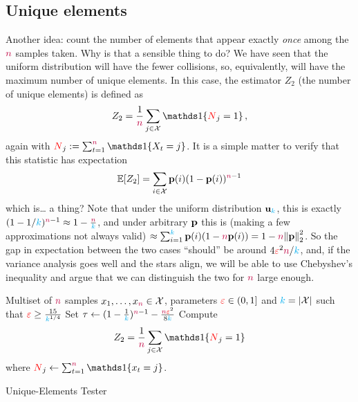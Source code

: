 \subsection{Unique elements}
  \label{sec:uniformity:unique} Another idea: count the number of elements that appear exactly \emph{once} among the ${\textcolor{purple}{n}}$ samples taken. Why is that a sensible thing to do? We have seen that the uniform distribution will have the fewer collisions, so, equivalently, will have the maximum number of unique elements. In this case, the estimator $Z_2$ (the number of unique elements) is defined as
\begin{equation}
  \label{eq:def:z2}
    Z_2 = \frac{1}{\ns} \sum_{j\in\domain} \indic{\occur_j=1}\,,
\end{equation}
again with $\occur_j \eqdef \sum_{t=1}^\ns \indic{X_t=j}$. It is a simple matter to verify that this statistic has expectation
\begin{equation}
  \label{eq:z2:expectation}
  \expect{Z_2} = \sum_{i\in\domain} \p(i)(1-\p(i))^{\ns-1}
\end{equation}
which is\dots{} a thing? Note that under the uniform distribution $\mathbf{u}_{\textcolor{cyan}{k}}$, this is exactly $(1-1/{\textcolor{cyan}{k}})^{{\textcolor{purple}{n}}-1}\approx 1 - \frac{{\textcolor{purple}{n}}}{{\textcolor{cyan}{k}}}$, and under arbitrary $\mathbf{p}$ this is (making a few approximations not always valid) $\approx \sum_{i=1}^\ab \p(i)(1-\ns\p(i)) = 1 - \ns\normtwo{\p}^2$. So the gap in expectation between the two cases ``should'' be around $4\textcolor{red}{\varepsilon}^2{\textcolor{purple}{n}}/{\textcolor{cyan}{k}}$, and, if the variance analysis goes well and the stars align, we will be able to use Chebyshev's inequality and argue that we can distinguish the two for ${\textcolor{purple}{n}}$ large enough.

\begin{algorithm}[ht!]
  \begin{algorithmic}[1]
    \Require Multiset of ${\textcolor{purple}{n}}$ samples $x_1,\dots,x_{\textcolor{purple}{n}} \in \mathcal{X}$, parameters $\textcolor{red}{\varepsilon}\in(0,1]$ and $\ab = \abs{\domain}$ such that $\textcolor{red}{\varepsilon} \geq \frac{15}{{\textcolor{cyan}{k}}^{1/4}}$
    \State Set $\tau \gets (1-\frac{1}{{\textcolor{cyan}{k}}})^{{\textcolor{purple}{n}}-1}-\frac{{\textcolor{purple}{n}}\textcolor{red}{\varepsilon}^2}{8{\textcolor{cyan}{k}}}$ 
    \State Compute 
    \[
        Z_2 = \frac{1}{\ns} \sum_{j\in\domain} \indic{\occur_j=1}
    \] where $\occur_j \gets \sum_{t=1}^\ns\indic{x_t=j}$.
     \Return \reject {}
    \Else\ 
      \Return \accept {}
    \EndIf
  \end{algorithmic}
  \caption{\label{algo:unique-elements}\sc Unique-Elements Tester}
\end{algorithm}

